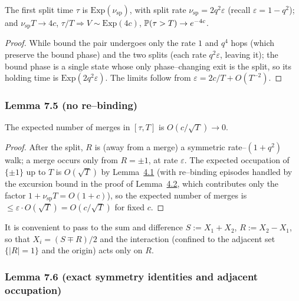 \documentclass[11pt]{article}
\theoremstyle{plain}
\theoremstyle{definition}
\theoremstyle{remark}
\newcommand{\To}{\Rightarrow}\newcommand{\so}{\mathfrak{so}}
\newcommand{\eps}{\varepsilon}\newcommand{\Exp}{\mathrm{Exp}}
\begin{document}
The first split time $\tau$ is $\Exp(\nu_{\mathrm{sp}})$, with split rate
$\nu_{\mathrm{sp}}=2q^2\eps$ (recall $\eps=1-q^2$); and $\nu_{\mathrm{sp}}T\to4c$,
$\tau/T\To V\sim\Exp(4c)$, $\mathbb{P}(\tau>T)\to e^{-4c}$.
\par
\begin{proof}
While bound the pair undergoes only the rate $1$ and $q^4$ hops (which preserve the
bound phase) and the two splits (each rate $q^2\eps$, leaving it); the bound phase is a
single state whose only phase--changing exit is the split, so its holding time is
$\Exp(2q^2\eps)$. The limits follow from $\eps=2c/T+O(T^{-2})$.
\end{proof}

\subsubsection{Lemma 7.5 (no re--binding)}\label{lem_rebind}

The expected number of merges in $[\tau,T]$ is $O(c/\sqrt T)\to0$.
\par
\begin{proof}
After the split, $R$ is (away from a merge) a symmetric rate--$(1+q^2)$ walk; a merge
occurs only from $R=\pm1$, at rate $\eps$. The expected occupation of $\{\pm1\}$ up to
$T$ is $O(\sqrt T)$ by Lemma~\hyperref[lem_free]{4.1} (with re--binding episodes handled by the
excursion bound in the proof of Lemma~\hyperref[lem_Rlclt]{4.2}, which contributes only the
factor $1+\nu_{\mathrm{sp}}T=O(1+c)$), so the expected number of merges is
$\le\eps\cdot O(\sqrt T)=O(c/\sqrt T)$ for fixed $c$.
\end{proof}

It is convenient to pass to the sum and difference $S:=X_1+X_2$, $R:=X_2-X_1$, so that
$X_i=(S\mp R)/2$ and the interaction (confined to the adjacent set $\{|R|=1\}$ and the
origin) acts only on $R$.

\subsubsection{Lemma 7.6 (exact symmetry identities and adjacent occupation)}\label{lem_occ}
\end{document}
